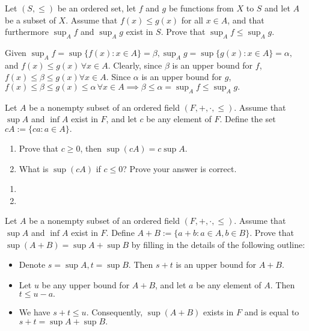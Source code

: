 \documentclass[12pt,letterpaper,boxed]{hmcpset}
\begin{document}
\begin{problem}[Exercise 1.7.]
Let $(S,\leq)$ be an ordered set, let $f$ and $g$ be functions from $X$ to $S$ and let $A$ be a subset of $X$. Assume that $f(x)\leq g(x)$ for all $x \in A$, and that furthermore $\sup_A f$ and $\sup_A g$ exist in $S$. Prove that $\sup_A f \leq \sup_A g.$
 \end{problem}

\begin{solution}
Given $\sup_{A}f=\sup\{f(x) : x \in A\}=\beta, \sup_{A}g=\sup\{g(x) : x \in A\}=\alpha,$ and $f(x) \leq g(x)\, \forall x \in A$. Clearly, since $\beta$ is an upper bound for $f$, $f(x)\leq \beta \leq g(x) \forall x\in A.$ Since $\alpha$ is an upper bound for $g$, $f(x)\leq \beta \leq g(x) \leq \alpha\, \forall x\in A \implies \beta \leq \alpha = \sup_A f \leq \sup_A g. $ 
\end{solution}

\begin{problem}[Exercise 2.3.]
Let $A$ be a nonempty subset of an ordered field $(F,+,\cdot,\leq)$. Assume that $\sup A$ and $\inf A$ exist in $F$, and let $c$ be any element of $F$. Define the set $cA := \{ ca : a \in A\}.$

\vspace{-2mm}
\begin{enumerate}
	\itemsep0em
	\item Prove that $ c \ge 0$, then $\sup(cA) = c\sup A.$ 
	\item What is $\sup(cA)$ if $c \le 0$? Prove your answer is correct.
\end{enumerate}

\end{problem}

\begin{solution}
\vspace{-2mm}
\begin{enumerate}
	\itemsep0em
	\item 
	\item  
\end{enumerate}
\end{solution}

\begin{problem}[Exercise 2.4]
Let $A$ be a nonempty subset of an ordered field $(F,+,\cdot,\leq)$. Assume that $\sup A$ and $\inf A$ exist in $F.$ Define $A + B := \{ a + b : a \in A, b \in B \}.$ Prove that $\sup(A + B) = \sup A + \sup B$ by filling in the details of the following outline: 
\vspace{-2mm}
\begin{itemize}
	\itemsep0em
	\item Denote $s = \sup A, t = \sup B.$ Then $s + t$ is an upper bound for $A + B.$
	\item Let $u$ be any upper bound for $A + B$, and let $a$ be any element of $A$. Then $t \leq u - a.$
	\item We have $s+t \leq u.$ Consequently, $\sup(A + B)$ exists in $F$ and is equal to $s + t = \sup A + \sup B.$ 
\end{itemize}
\end{problem}
\end{document}
